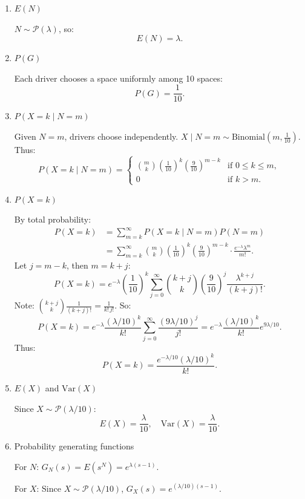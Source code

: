 \documentclass[12pt]{article}
\begin{document}
\begin{answerbox}
\begin{enumerate}
  \item \( E(N) \)

\( N \sim \mathcal{P}(\lambda) \), so:
\[
E(N) = \lambda.
\]

  \item \( P(G) \)

  Each driver chooses a space uniformly among 10 spaces:
\[
P(G) = \frac{1}{10}.
\]

  \item \( P(X = k \mid N = m) \)

  Given \( N = m \), drivers choose independently. \( X \mid N = m \sim \text{Binomial}(m, \frac{1}{10}) \).  
Thus:
\[
P(X = k \mid N = m) = 
\begin{cases}
\binom{m}{k} \left( \frac{1}{10} \right)^k \left( \frac{9}{10} \right)^{m-k} & \text{if } 0 \le k \le m, \\
0 & \text{if } k > m.
\end{cases}
\]

  \item \( P(X = k) \)

  By total probability:
\begin{align*}
  P(X = k)  & = \sum_{m=k}^{\infty} P(X = k \mid N = m) P(N = m) \\
            & = \sum_{m=k}^{\infty} \binom{m}{k} \left( \frac{1}{10} \right)^k \left( \frac{9}{10} \right)^{m-k} \cdot \frac{e^{-\lambda} \lambda^m}{m!}.
\end{align*}
Let \( j = m - k \), then \( m = k + j \):
\[
P(X = k) = e^{-\lambda} \left( \frac{1}{10} \right)^k \sum_{j=0}^{\infty} \binom{k+j}{k} \left( \frac{9}{10} \right)^{j} \frac{\lambda^{k+j}}{(k+j)!}.
\]
Note: \(\binom{k+j}{k} \frac{1}{(k+j)!} = \frac{1}{k! \, j!}\). So:
\[
P(X = k) = e^{-\lambda} \frac{(\lambda/10)^k}{k!} \sum_{j=0}^{\infty} \frac{(9\lambda/10)^j}{j!}
= e^{-\lambda} \frac{(\lambda/10)^k}{k!} e^{9\lambda/10}.
\]
Thus:
\[
P(X = k) = \frac{e^{-\lambda/10} (\lambda/10)^k}{k!}.
\]

  \item \( E(X) \) and \( \text{Var}(X) \)

  Since \( X \sim \mathcal{P}(\lambda/10) \):
\[
E(X) = \frac{\lambda}{10}, \quad \text{Var}(X) = \frac{\lambda}{10}.
\]

  \item Probability generating functions

  For \( N \): \( G_N(s) = E(s^N) = e^{\lambda(s-1)} \).  

  For \( X \): Since \( X \sim \mathcal{P}(\lambda/10) \), \( G_X(s) = e^{(\lambda/10)(s-1)} \). 
\end{enumerate}
\end{answerbox}
\end{document}
